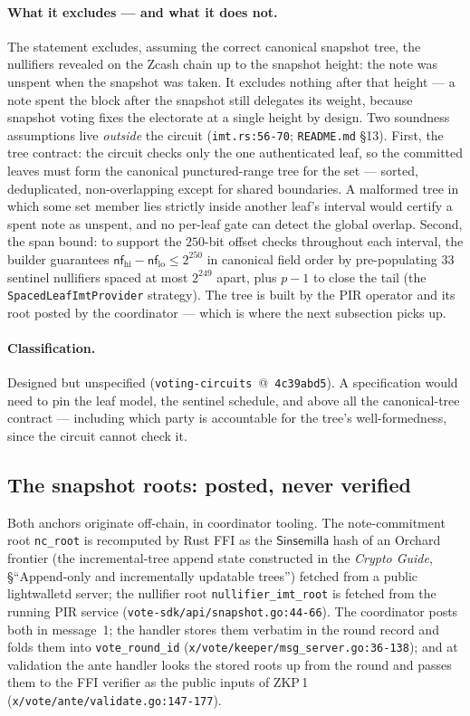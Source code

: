 \documentclass[11pt,a4paper]{article}
\theoremstyle{definition}
\newcommand{\nfsym}{\mathsf{nf}}
\newcommand{\Sinsemilla}{\ensuremath{\mathsf{Sinsemilla}}}
\begin{document}
\paragraph{What it excludes --- and what it does not.} The statement
excludes, assuming the correct canonical snapshot tree, the nullifiers
revealed on the Zcash chain up to the snapshot height: the note was
unspent when the snapshot was taken. It
excludes nothing after that height --- a note spent the block after the
snapshot still delegates its weight, because snapshot voting fixes the
electorate at a single height by design. Two soundness assumptions live
\emph{outside} the circuit (\texttt{imt.rs:56-70};
\texttt{README.md} \S13). First, the tree contract: the circuit checks
only the one authenticated leaf, so the committed leaves must form the
canonical punctured-range tree for the set --- sorted, deduplicated,
non-overlapping except for shared boundaries. A malformed tree in which
some set member lies strictly inside another leaf's interval would certify
a spent note as unspent, and no per-leaf gate can detect the global
overlap. Second, the span bound: to support the $250$-bit offset checks
throughout each interval, the builder guarantees
$\nfsym_{\mathrm{hi}} - \nfsym_{\mathrm{lo}} \le 2^{250}$ in canonical
field order by pre-populating $33$ sentinel
nullifiers spaced at most $2^{249}$ apart, plus $p-1$ to close the tail
(the \texttt{SpacedLeafImtProvider} strategy). The tree is built by the
PIR operator and its root posted by the coordinator --- which is where the
next subsection picks up.

\paragraph{Classification.} Designed but unspecified
(\texttt{voting-circuits}~@~\texttt{4c39abd5}). A specification would need
to pin the leaf model, the sentinel schedule, and above all the
canonical-tree contract --- including which party is accountable for the
tree's well-formedness, since the circuit cannot check it.

\subsection{The snapshot roots: posted, never verified}
\label{sec:vote-snapshot}

Both anchors originate off-chain, in coordinator tooling. The
note-commitment root \texttt{nc\_root} is recomputed by Rust FFI as the
\Sinsemilla{} hash of an Orchard frontier (the incremental-tree append
state constructed in the \emph{Crypto Guide}, \S``Append-only and
incrementally updatable trees'') fetched from a public lightwalletd
server; the nullifier root \texttt{nullifier\_imt\_root} is
fetched from the running PIR service
(\texttt{vote-sdk/api/snapshot.go:44-66}). The coordinator posts both in
message~1; the handler stores them verbatim in the round record and folds
them into \texttt{vote\_round\_id}
(\texttt{x/vote/keeper/msg\_server.go:36-138}); and at validation the ante
handler looks the stored roots up from the round and passes them to the
FFI verifier as the public inputs of ZKP\,1
(\texttt{x/vote/ante/validate.go:147-177}).
\end{document}
